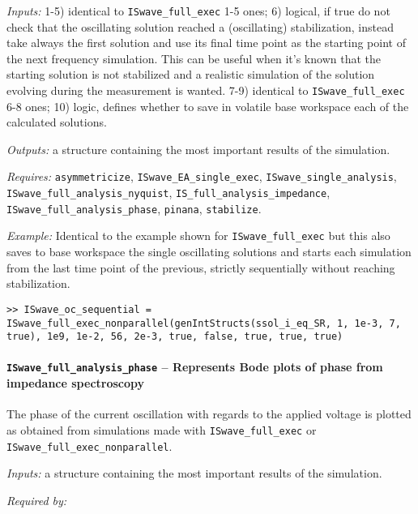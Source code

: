 \textit{Inputs:} 1-5) identical to \texttt{ISwave\_full\_exec} 1-5 ones;
6) logical, if true do not check that the oscillating solution reached a
     (oscillating) stabilization, instead take always the first solution
     and use its final time point as the starting point of the next
     frequency simulation. This can be useful when it's known that the
     starting solution is not stabilized and a realistic simulation of the
     solution evolving during the measurement is wanted.
7-9) identical to \texttt{ISwave\_full\_exec} 6-8 ones;
10) logic, defines whether to save in volatile base
    workspace each of the calculated solutions.
    
\textit{Outputs:} a structure containing the most important results of the simulation.

\textit{Requires:} \texttt{asymmetricize}, \texttt{ISwave\_EA\_single\_exec},
\texttt{ISwave\_single\_analysis}, \texttt{ISwave\_full\_analysis\_nyquist},
\texttt{IS\_full\_analysis\_impedance}, \texttt{ISwave\_full\_analysis\_phase}, \texttt{pinana},
\texttt{stabilize}.


\textit{Example:} Identical to the example shown for \texttt{ISwave\_full\_exec} but this also saves to base workspace the single oscillating solutions and starts each simulation from the last time point of the previous, strictly sequentially without reaching stabilization.
\begin{lstlisting}[style=Matlab-editor]
>> ISwave_oc_sequential = ISwave_full_exec_nonparallel(genIntStructs(ssol_i_eq_SR, 1, 1e-3, 7, true), 1e9, 1e-2, 56, 2e-3, true, false, true, true, true)
\end{lstlisting}

		\paragraph{\texttt{ISwave\_full\_analysis\_phase} -- Represents Bode plots of phase from impedance spectroscopy}
		The phase of the current oscillation with regards to the applied voltage is plotted as obtained from simulations made with \texttt{ISwave\_full\_exec} or \texttt{ISwave\_full\_exec\_nonparallel}.
		
		
		\textit{Inputs:} a structure containing the most important results of the simulation.
		
		
		
		\textit{Required by:} 
		
